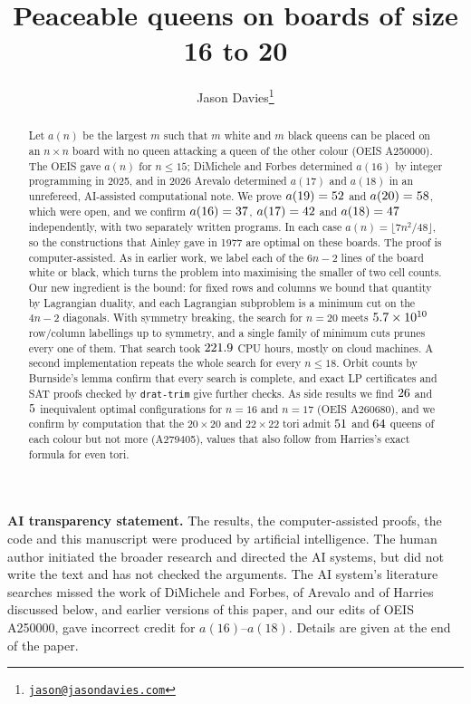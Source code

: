 \documentclass[11pt]{article}
\title{Peaceable queens on boards of size 16 to 20}
\author{Jason Davies\thanks{\href{mailto:jason@jasondavies.com}{\nolinkurl{jason@jasondavies.com}}}}
\date{\clDate}
\theoremstyle{remark}
\begin{document}
\maketitle
\begin{abstract}
Let $a(n)$ be the largest $m$ such that $m$ white and $m$ black queens can be placed on an $n\times n$
board with no queen attacking a queen of the other colour (OEIS A250000). The OEIS gave $a(n)$ for
$n\le15$; DiMichele and Forbes determined $a(16)$ by integer programming in 2025, and in 2026 Arevalo
determined $a(17)$ and $a(18)$ in an unrefereed, AI-assisted computational note. We prove $a(19)=52$ and $a(20)=58$, which
were open, and we confirm $a(16)=37$, $a(17)=42$ and $a(18)=47$
independently, with two separately written programs. In each case $a(n)=\lfloor7n^2/48\rfloor$, so the
constructions that Ainley gave in 1977 are optimal on these boards. The proof is computer-assisted. As in
earlier work, we label each of the $6n-2$ lines of the board white or black, which turns the problem into
maximising the smaller of two cell counts. Our new ingredient is the bound: for fixed rows and columns we
bound that quantity by Lagrangian duality, and each Lagrangian subproblem is a minimum cut on the $4n-2$
diagonals. With symmetry breaking, the search for $n=20$ meets $5.7\times10^{10}$ row/column labellings
up to symmetry, and a single family of minimum cuts prunes every one of them. That search took
$221.9$ CPU hours, mostly on cloud machines. A second implementation repeats the whole search for
every $n\le18$. Orbit counts by Burnside's lemma confirm that every search is complete, and exact LP
certificates and SAT proofs checked by \texttt{drat-trim} give further checks. As side results we find
$26$ and $5$ inequivalent optimal configurations for $n=16$ and $n=17$ (OEIS
A260680), and we confirm by computation that the $20\times20$ and $22\times22$ tori admit
$51$ and $64$ queens of each colour but not more (A279405), values that also
follow from Harries's exact formula for even tori.
\end{abstract}

\noindent\textbf{AI transparency statement.} The results, the computer-assisted proofs, the code and this
manuscript were produced by artificial intelligence. The human author initiated the broader research and
directed the AI systems, but did not write the text and has not checked the arguments. The AI system's
literature searches missed the work of DiMichele and Forbes, of Arevalo and of Harries discussed below,
and earlier versions of this paper, and our edits of OEIS A250000, gave incorrect credit for
$a(16)$--$a(18)$. Details are given at the end of the paper.
\end{document}
